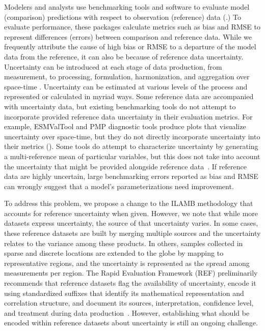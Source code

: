 \documentclass{agujournal}
\begin{document}
Modelers and analysts use benchmarking tools and software to evaluate model (comparison) predictions with respect to observation (reference) data (\cite{Lee_EGU_20240515,Righi_EGU_20200316,Collier_JAMES_20181101}.) To evaluate performance, these packages calculate metrics such as bias and RMSE to represent differences (errors) between comparison and reference data. While we frequently attribute the cause of high bias or RMSE to a departure of the model data from the reference, it can also be because of reference data uncertainty. Uncertainty can be introduced at each stage of data production, from measurement, to processing, formulation, harmonization, and aggregation over space-time \cite{Merchant_ESSD_20170525}. Uncertainty can be estimated at various levels of the process and represented or calculated in myriad ways. Some reference data are accompanied with uncertainty data, but existing benchmarking tools do not attempt to incorporate provided reference data uncertainty in their evaluation metrics. For example, ESMValTool and PMP diagnostic tools produce plots that visualize uncertainty over space-time, but they do not directly incorporate uncertainty into their metrics (\cite{Lee_EGU_20240515,Righi_EGU_20200316}). Some tools do attempt to characterize uncertainty by generating a multi-reference mean of particular variables, but this does not take into account the uncertainty that might be provided alongside reference data~\cite{Hassler_RG_20260208}. If reference data are highly uncertain, large benchmarking errors reported as bias and RMSE can wrongly suggest that a model's parameterizations need improvement.

To address this problem, we propose a change to the ILAMB methodology that accounts for reference uncertainty when given. However, we note that while more datasets express uncertainty, the source of that uncertainty varies. In some cases, these reference datasets are built by merging multiple sources and the uncertainty relates to the variance among these products. In others, samples collected in sparse and discrete locations are extended to the globe by mapping to representative regions, and the uncertainty is represented as the spread among measurements per region. The Rapid Evaluation Framework (REF) preliminarily recommends that reference datasets flag the availability of uncertainty, encode it using standardized suffixes that identify its mathematical representation and correlation structure, and document its sources, interpretation, confidence level, and treatment during data production~\cite{Dora_Zenodo_20251121}. However, establishing what should be encoded within reference datasets about uncertainty is still an ongoing challenge.
\end{document}
